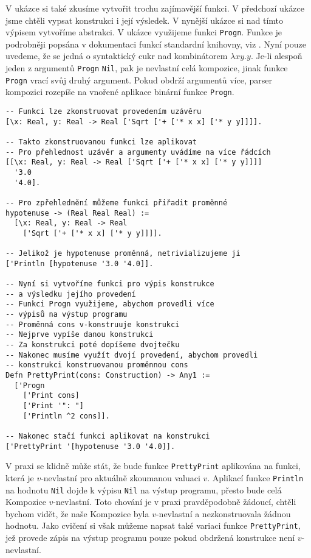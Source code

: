 V ukázce si také zkusíme vytvořit trochu zajímavější funkci. V předchozí ukázce jsme chtěli vypsat
konstrukci i její výsledek. V nynější ukázce si nad tímto výpisem vytvoříme abstrakci. V ukázce
využijeme funkci \lstinline{Progn}. Funkce je podrobněji popsána v dokumentaci funkcí standardní
knihovny, viz . Nyní pouze uvedeme, že se jedná o syntaktický cukr
nad kombinátorem $\lambda x y . y$. Je-li alespoň jeden z argumentů \lstinline{Progn} \lstinline{Nil},
pak je nevlastní celá kompozice, jinak funkce \lstinline{Progn} vrací svůj druhý argument. Pokud
obdrží argumentů více, parser kompozici rozepíše na vnořené aplikace binární funkce
\lstinline{Progn}.

\begin{lstlisting}[caption={Funkce a uzávěry}, language=Tilscript]
-- Funkci lze zkonstruovat provedením uzávěru
[\x: Real, y: Real -> Real ['Sqrt ['+ ['* x x] ['* y y]]]].

-- Takto zkonstruovanou funkci lze aplikovat
-- Pro přehlednost uzávěr a argumenty uvádíme na více řádcích
[[\x: Real, y: Real -> Real ['Sqrt ['+ ['* x x] ['* y y]]]]
  '3.0
  '4.0].

-- Pro zpřehlednění můžeme funkci přiřadit proměnné
hypotenuse -> (Real Real Real) :=
  [\x: Real, y: Real -> Real
    ['Sqrt ['+ ['* x x] ['* y y]]]].

-- Jelikož je hypotenuse proměnná, netrivializujeme ji
['Println [hypotenuse '3.0 '4.0]].

-- Nyní si vytvoříme funkci pro výpis konstrukce
-- a výsledku jejího provedení
-- Funkci Progn využijeme, abychom provedli více
-- výpisů na výstup programu
-- Proměnná cons v-konstruuje konstrukci
-- Nejprve vypíše danou konstrukci
-- Za konstrukci poté dopíšeme dvojtečku
-- Nakonec musíme využít dvojí provedení, abychom provedli
-- konstrukci konstruovanou proměnnou cons
Defn PrettyPrint(cons: Construction) -> Any1 :=
  ['Progn
    ['Print cons]
    ['Print '": "]
    ['Println ^2 cons]].

-- Nakonec stačí funkci aplikovat na konstrukci
['PrettyPrint '[hypotenuse '3.0 '4.0]].
\end{lstlisting}

V praxi se klidně může stát, že bude funkce \lstinline{PrettyPrint} aplikována na funkci,
která je $v$-nevlastní pro aktuálně zkoumanou valuaci $v$. Aplikací funkce \lstinline{Println}
na hodnotu \lstinline{Nil} dojde k výpisu \lstinline{Nil} na výstup programu, přesto bude celá
Kompozice $v$-nevlastní. Toto chování je v praxi pravděpodobně žádoucí, chtěli bychom vidět, že naše
Kompozice byla $v$-nevlastní a nezkonstruovala žádnou hodnotu. Jako cvičení si však můžeme napsat
také variaci funkce \lstinline{PrettyPrint}, jež provede zápis na výstup programu pouze pokud
obdržená konstrukce není $v$-nevlastní.

